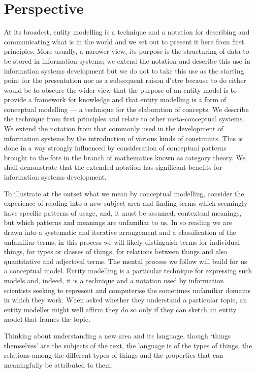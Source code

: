 \section{Perspective}
\label{Perspective}
At its broadest, entity modelling is a technique and a notation for describing and communicating what is in the world and we set out to present it here from first principles. More usually, a narower view, its purpose is the structuring of data to be stored in information systems; we extend the notation and describe this use in information systems development but we do not to take this use as the starting point for the presentation nor as a subsequent raison d'etre because to do either would be to obscure the wider view that the purpose of an entity model is to provide a framework for knowledge and that entity modelling is a form of conceptual modelling — a technique for the elaboration of concepts. We describe the technique from first principles and relate to other meta-conceptual systems. We extend the notation from that commonly used in the development of information systems by the introduction of various kinds of constraints. This is done in a way strongly influenced by consideration of conceptual patterns brought to the fore in the branch of mathematics known as category theory. We shall demonstrate that the extended notation has significant benefits for information systems development.

To illustrate at the outset what we mean by conceptual modelling, consider the experience of reading into a new subject area and finding terms which seemingly have specific patterns of usage, and, it must be assumed, contextual meanings, but which patterns and meanings are unfamiliar to us. In so reading we are drawn into a systematic and iterative arrangement and a classification of the unfamiliar terms; in this process we will likely distinguish terms for individual things, for types or classes of things, for relations between things and also quantitative and adjectival terms. The mental process we follow will build for us a conceptual model. Entity modelling is a particular technique for expressing such models and, indeed, it is a technique and a notation used by information scientists seeking to represent and computerise the sometimes unfamiliar domains in which they work. When asked whether they understand a particular topic, an entity modeller might well affirm they do so only if they can sketch an entity model that frames the topic.

Thinking about understanding a new area and its language, though ‘things themselves’ are the subjects of the text, the language is of the types of things, the relations among the different types of things and the properties that can meaningfully be attributed to them. 

